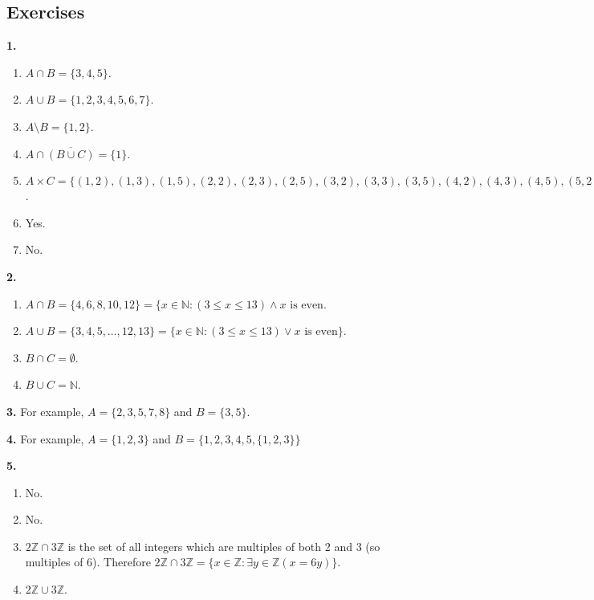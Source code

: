 \documentclass[10pt,]{memoir}
\theoremstyle{plain}
\theoremstyle{definition}
\theoremstyle{definition}
\theoremstyle{definition}
\numberwithin{equation}{chapter}
\def\N{\mathbb N}
\def\Z{\mathbb Z}
\def\st{:}
\renewcommand{\bar}{\overline}
\begin{document}
\subsection*{ Exercises}
\noindent\textbf{1.}\quad{}\leavevmode%
\begin{enumerate}[label=(\alph*)]
\item\hypertarget{li-235}{}\(A \cap B = \{3,4,5\}\).\item\hypertarget{li-236}{}\(A \cup B = \{1,2,3,4,5,6,7\}\).\item\hypertarget{li-237}{}\(A \setminus B = \{1,2\}\).\item\hypertarget{li-238}{}\(A \cap \bar{(B \cup C)} = \{1\}\).\item\hypertarget{li-239}{}\(A \times C = \{(1,2), (1,3), (1,5), (2,2), (2,3), (2,5), (3,2), (3,3), (3,5), (4,2), (4,3), (4,5), (5,2), (5,3), (5,5)\}\).\item\hypertarget{li-240}{}Yes.%
\item\hypertarget{li-241}{}No.%
\end{enumerate}
\par\smallskip
\noindent\textbf{2.}\quad{}\leavevmode%
\begin{enumerate}[label=(\alph*)]
\item\hypertarget{li-246}{}\(A \cap B = \{4,6,8,10,12\} = \{x \in \N \st (3 \le x \le 13) \wedge x \mbox{ is even}\).\item\hypertarget{li-247}{}\(A \cup B = \{3, 4, 5, \ldots, 12, 13\} = \{x \in \N \st (3 \le x \le 13) \vee x \mbox{ is even} \}\). \item\hypertarget{li-248}{}\(B \cap C = \emptyset\).\item\hypertarget{li-249}{}\(B \cup C = \N\).\end{enumerate}
\par\smallskip
\noindent\textbf{3.}\quad{}
          For example, \(A = \{2,3,5,7,8\}\) and \(B = \{3,5\}\).
\par\smallskip
\noindent\textbf{4.}\quad{}
          For example, \(A = \{1,2,3\}\) and \(B = \{1,2,3,4,5,\{1,2,3\}\}\)
\par\smallskip
\noindent\textbf{5.}\quad{}\leavevmode%
\begin{enumerate}[label=(\alph*)]
\item\hypertarget{li-254}{} No. %
\item\hypertarget{li-255}{} No. %
\item\hypertarget{li-256}{}\(2\Z \cap 3\Z\) is the set of all integers which are multiples of both 2 and 3 (so multiples of 6). Therefore \(2\Z \cap 3\Z = \{x \in \Z \st \exists y\in \Z(x = 6y)\}\).\item\hypertarget{li-257}{}\(2\Z \cup 3\Z\).\end{enumerate}
\end{document}
